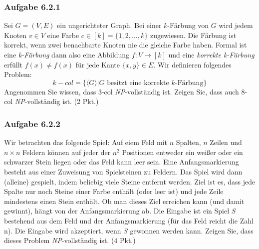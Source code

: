 \documentclass{article}
\begin{document}
\subsubsection*{Aufgabe 6.2.1}
\label{sssec:6.2.1}
Sei $G = (V,E)$ ein ungerichteter Graph.
Bei einer $k$-Färbung von $G$ wird jedem Knoten $v \in V$ eine Farbe $c \in [k] = \{1,2,\dots,k\}$ zugewiesen.
Die Färbung ist korrekt, wenn zwei benachbarte Knoten nie die gleiche Farbe haben.
Formal ist eine \textit{k-Färbung} dann also eine Abbildung $f : V \rightarrow [k]$ und eine \textit{korrekte k-Färbung} erfüllt $f(x) \neq f(x)$ für jede Kante $\{x,y\} \in E$.
Wir definieren folgendes Problem:
\[
	k-col = \{\langle G \rangle | G \text{ besitzt eine korrekte } k\text{-Färbung}\}
\]
Angenommen Sie wissen, dass 3-col \textit{NP}-vollständig ist.
Zeigen Sie, dass auch 8-col \textit{NP}-vollständig ist. (2 Pkt.)
\vspace{1cm}\-\\

\subsubsection*{Aufgabe 6.2.2}
\label{sssec:6.2.2}
Wir betrachten das folgende Spiel: Auf eiem Feld mit $n$ Spalten, $n$ Zeilen und $n \times n $ Feldern können auf jeder der $n^2$ Positionen entweder ein weißer oder ein schwarzer Stein liegen oder das Feld kann leer sein.
Eine Anfangsmarkierung besteht aus einer Zuweisung von Spielsteinen zu Feldern.
Das Spiel wird dann (alleine) gespielt, indem beliebig viele Steine entfernt werden.
Ziel ist es, dass jede Spalte nur noch Steine einer Farbe enthält (oder leer ist) und jede Zeile mindestens einen Stein enthält.
Ob man dieses Ziel erreichen kann (und damit gewinnt), hängt von der Anfangsmarkierung ab.
Die Eingabe ist ein Spiel $S$ bestehend aus dem Feld und der Anfangsmarkierung (für das Feld reicht die Zahl n).
Die Eingabe wird akzeptiert, wenn $S$ gewonnen werden kann.
Zeigen Sie, dass dieses Problem \textit{NP}-vollständig ist. (4 Pkt.)
\vspace{1cm}\-\\
\end{document}
